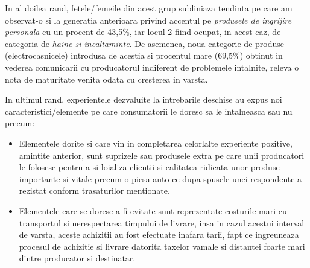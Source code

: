 \documentclass[a4paper, 12pt]{article}
\begin{document}
\begin{itemize}
		\quad In al doilea rand, fetele/femeile din acest grup subliniaza tendinta pe care am observat-o si la generatia anterioara privind accentul pe \textit{produsele de ingrijire personala} cu un procent de 43,5\%, iar locul 2 fiind ocupat, in acest caz, de categoria de \textit{haine si incaltaminte}. De asemenea, noua categorie de produse (electrocasnicele)  introdusa de acestia si procentul mare (69,5\%) obtinut in vederea comunicarii cu producatorul indiferent de problemele intalnite, releva o nota de maturitate venita odata cu cresterea in varsta.
		
		\quad In ultimul rand, experientele dezvaluite la intrebarile deschise au expus noi caracteristici/elemente pe care consumatorii le doresc sa le intalneasca sau nu precum:
		\begin{itemize}
			\item Elementele dorite si care vin in completarea celorlalte experiente pozitive, amintite anterior, sunt suprizele sau produsele extra pe care unii producatori le folosesc pentru a-si loializa clientii si  calitatea ridicata unor produse importante si vitale precum o piesa auto ce dupa spusele unei respondente a rezistat conform trasaturilor mentionate.
			\item Elementele care se doresc a fi evitate sunt reprezentate costurile mari cu transportul si nerespectarea timpului de livrare, insa in cazul acestui interval de varsta, aceste achizitii au fost efectuate inafara tarii, fapt ce ingreuneaza procesul de achizitie si livrare datorita taxelor vamale si distantei foarte mari dintre producator si destinatar.
		\end{itemize}
	\end{itemize}
	
\end{document}

